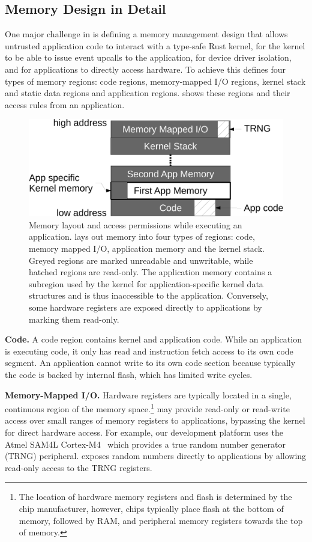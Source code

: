 \subsection{\name Memory Design in Detail}
\label{sec:arch:memory-design}

One major challenge in \name is defining a memory management design
that allows untrusted application code 
to interact with a type-safe Rust kernel, for the kernel to be able to
issue event upcalls to the application, for device driver isolation, and 
for applications to directly
access hardware. To achieve this
\name defines four types of memory regions: code regions, 
memory-mapped I/O regions,
kernel stack and static data regions and application regions.
 shows these regions and their access rules from
an application.

\begin{figure}
 \centering
\includegraphics[width=1\columnwidth]{img/memory-layout-crop}
\caption{Memory layout and access permissions while executing an application.
\name lays out memory into four types of regions: code, memory mapped I/O,
application memory and the kernel stack. Greyed regions are marked unreadable
and unwritable, while hatched regions are read-only. The application memory
contains a subregion used by the kernel for application-specific kernel data
structures and is thus inaccessible to the application. Conversely, some
hardware registers are exposed directly to applications by marking them
read-only.}
 \label{fig:memory-layout}
\end{figure}



{\bf Code.}
A code region contains kernel and application code. While an application is
executing code, it only has read and instruction fetch access to its own code
segment. An application cannot write to its own code section because typically
the code is backed by internal flash, which has limited write cycles.

{\bf Memory-Mapped I/O.}
Hardware registers are typically located in a single, continuous region of the
memory space.\footnote{The location of hardware memory registers and flash is
determined by the chip manufacturer, however, chips typically place flash at
the bottom of memory, followed by RAM, and peripheral memory registers towards
the top of memory.} \name may provide read-only or read-write access over small
ranges of memory registers to applications, bypassing the kernel for direct
hardware access. For example, our development platform uses the Atmel SAM4L
Cortex-M4~\cite{sam4l} which provides a true random number generator (TRNG)
peripheral. \name exposes random numbers directly to applications by allowing
read-only access to the TRNG registers.

